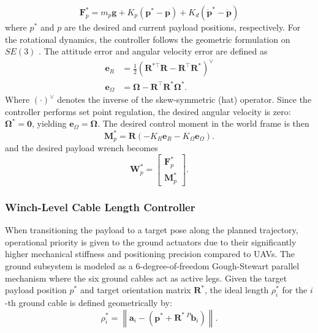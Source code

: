 \begin{equation}
    \mathbf{F}_p^* = m_p \mathbf{g} + K_p \left(     \mathbf{p}^*-\mathbf{p} \right) + K_d \left(     \dot{\mathbf{p}}^*-\dot{\mathbf{p}} \right) 
\end{equation}
where \(p^*\) and \(p\) are the desired and current payload positions, respectively. For the rotational dynamics, the controller follows the geometric formulation on \(SE(3)\) \cite{lee_geometric_2010}. The attitude error and angular velocity error are defined as
\begin{equation}
\begin{aligned}
    \mathbf{e}_R &= \frac{1}{2} \left( \mathbf{R}^{*\top}\mathbf{R} - \mathbf{R}^{\top}\mathbf{R}^* \right)^\vee \\
    \mathbf{e}_\Omega &= \boldsymbol{\Omega} - \mathbf{R}^{\top}\mathbf{R}^* \boldsymbol{\Omega}^*.
\end{aligned}
\end{equation}
Where \((\cdot)^\vee\) denotes the inverse of the skew-symmetric (hat) operator. Since the controller performs set point regulation, the desired angular velocity is zero: \(\boldsymbol{\Omega}^* = \mathbf{0}\), yielding $\mathbf{e}_\Omega = \boldsymbol{\Omega}$. The desired control moment in the world frame is then
\begin{equation}
    \mathbf{M}_p^* = \mathbf{R} \left(-K_R\mathbf{e}_R     -     K_\Omega\mathbf{e}_\Omega \right).
\end{equation}
and the desired payload wrench becomes
\begin{equation}
    \mathbf{W}_p^*
    =
    \begin{bmatrix}
        \mathbf{F}_p^* \\
        \mathbf{M}_p^*
    \end{bmatrix}.
\end{equation}

\subsubsection{Winch-Level Cable Length Controller}
When transitioning the payload to a target pose along the planned trajectory, operational priority is given to the ground actuators due to their significantly higher mechanical stiffness and positioning precision compared to UAVs.
The ground subsystem is modeled as a 6-degree-of-freedom Gough-Stewart parallel mechanism where the six ground cables act as active legs. Given the target payload position $p^*$ and target orientation matrix $\mathbf R^*$, the ideal length $\rho_i^*$ for the $i$-th ground cable is defined geometrically by:
\begin{equation}
    \rho_i^*
    =
    \left\|
        \mathbf{a}_i
        -
        \left(
            \mathbf{p}^*
            +
            \mathbf{R}^*\,{}^P\mathbf{b}_i
        \right)
    \right\|.
\end{equation}

